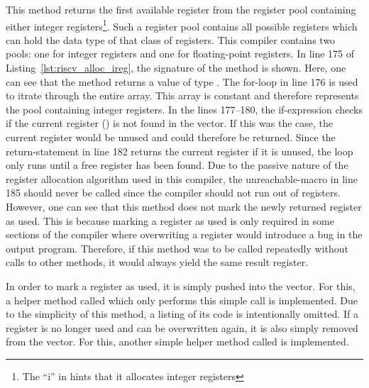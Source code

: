 This method returns the first available register from the register pool containing either integer registers\footnote{The \enquote{i} in  hints that it allocates integer registers}.
Such a register pool contains all possible registers which can hold the data type of that class of registers.
This compiler contains two pools: one for integer registers and one for floating-point registers.
In line 175 of Listing~\ref{lst:riscv_alloc_ireg}, the signature of the method is shown.
Here, one can see that the method returns a value of type .
The for-loop in line 176 is used to itrate through the entire  array.
This array is constant and therefore represents the pool containing integer registers.
In the lines 177--180, the if-expression checks if the current register () is not found in the  vector.
If this was the case, the current register would be unused and could therefore be returned.
Since the return-statement in line 182 returns the current register if it is unused, the loop only runs until a free register has been found.
Due to the passive nature of the register allocation algorithm used in this compiler, the unreachable-macro in line 185 should never be called since the compiler should not run out of registers.
However, one can see that this method does not mark the newly returned register as used.
This is because marking a register as used is only required in some sections of the compiler where overwriting a register would introduce a bug in the output program.
Therefore, if this method was to be called repeatedly without calls to other methods, it would always yield the same result register.

In order to mark a register as used, it is simply pushed into the  vector.
For this, a helper method called  which only performs this simple call is implemented.
Due to the simplicity of this method, a listing of its code is intentionally omitted.
If a register is no longer used and can be overwritten again, it is also simply removed from the  vector.
For this, another simple helper method called  is implemented.

